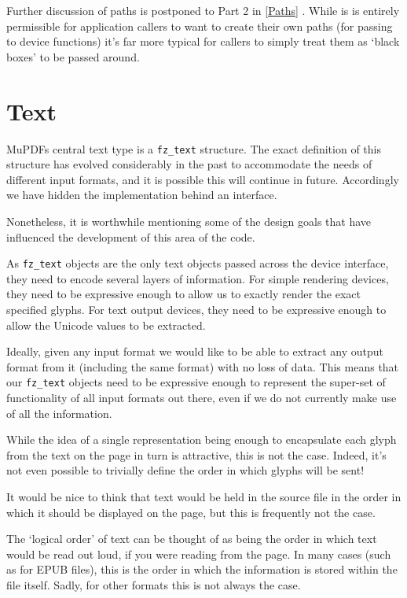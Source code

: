 \documentclass[oneside]{book}
\newcommand{\rjwref}[1] {\autoref{#1} \nameref{#1}}
\begin{document}
Further discussion of paths is postponed to Part 2 in \rjwref{Paths}. While is is entirely permissible for application callers to want to create their own paths (for passing to device functions) it's far more typical for callers to simply treat them as `black boxes' to be passed around.

\section{Text}
\label{TextOverview}

MuPDFs central text type is a \texttt{fz\_text} structure. The exact definition of this structure has evolved considerably in the past to accommodate the needs of different input formats, and it is possible this will continue in future. Accordingly we have hidden the implementation behind an interface.

Nonetheless, it is worthwhile mentioning some of the design goals that have influenced the development of this area of the code.

As \texttt{fz\_text} objects are the only text objects passed across the device interface, they need to encode several layers of information. For simple rendering devices, they need to be expressive enough to allow us to exactly render the exact specified glyphs. For text output devices, they need to be expressive enough to allow the Unicode values to be extracted.

Ideally, given any input format we would like to be able to extract any output format from it (including the same format) with no loss of data. This means that our \texttt{fz\_text} objects need to be expressive enough to represent the super-set of functionality of all input formats out there, even if we do not currently make use of all the information.

While the idea of a single representation being enough to encapsulate each glyph from the text on the page in turn is attractive, this is not the case. Indeed, it's not even possible to trivially define the order in which glyphs will be sent!

It would be nice to think that text would be held in the source file in the order in which it should be displayed on the page, but this is frequently not the case.

The `logical order' of text can be thought of as being the order in which text would be read out loud, if you were reading from the page. In many cases (such as for EPUB files), this is the order in which the information is stored within the file itself. Sadly, for other formats this is not always the case.
\end{document}
